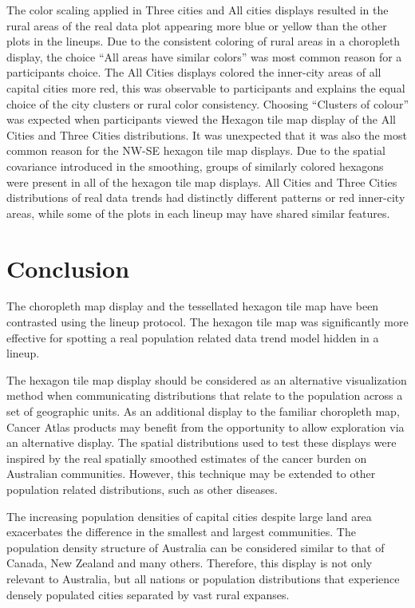 \documentclass[conference,final,]{IEEEtran}
\begin{document}
The color scaling applied in Three cities and All cities displays resulted in the rural areas of the real data plot appearing more blue or yellow than the other plots in the lineups.
Due to the consistent coloring of rural areas in a choropleth display, the choice ``All areas have similar colors'' was most common reason for a participants choice. The All Cities displays colored the inner-city areas of all capital cities more red, this was observable to participants and explains the equal choice of the city clusters or rural color consistency.
Choosing ``Clusters of colour'' was expected when participants viewed the Hexagon tile map display of the All Cities and Three Cities distributions. It was unexpected that it was also the most common reason for the NW-SE hexagon tile map displays.
Due to the spatial covariance introduced in the smoothing, groups of similarly colored hexagons were present in all of the hexagon tile map displays. All Cities and Three Cities distributions of real data trends had distinctly different patterns or red inner-city areas, while some of the plots in each lineup may have shared similar features.

\hypertarget{conclusion}{%
\section{Conclusion}\label{conclusion}}

The choropleth map display and the tessellated hexagon tile map have been contrasted using the lineup protocol. The hexagon tile map was significantly more effective for spotting a real population related data trend model hidden in a lineup.

The hexagon tile map display should be considered as an alternative visualization method when communicating distributions that relate to the population across a set of geographic units. As an additional display to the familiar choropleth map, Cancer Atlas products may benefit from the opportunity to allow exploration via an alternative display. The spatial distributions used to test these displays were inspired by the real spatially smoothed estimates of the cancer burden on Australian communities. However, this technique may be extended to other population related distributions, such as other diseases.

The increasing population densities of capital cities despite large land area exacerbates the difference in the smallest and largest communities.
The population density structure of Australia can be considered similar to that of Canada, New Zealand and many others. Therefore, this display is not only relevant to Australia, but all nations or population distributions that experience densely populated cities separated by vast rural expanses.
\end{document}
